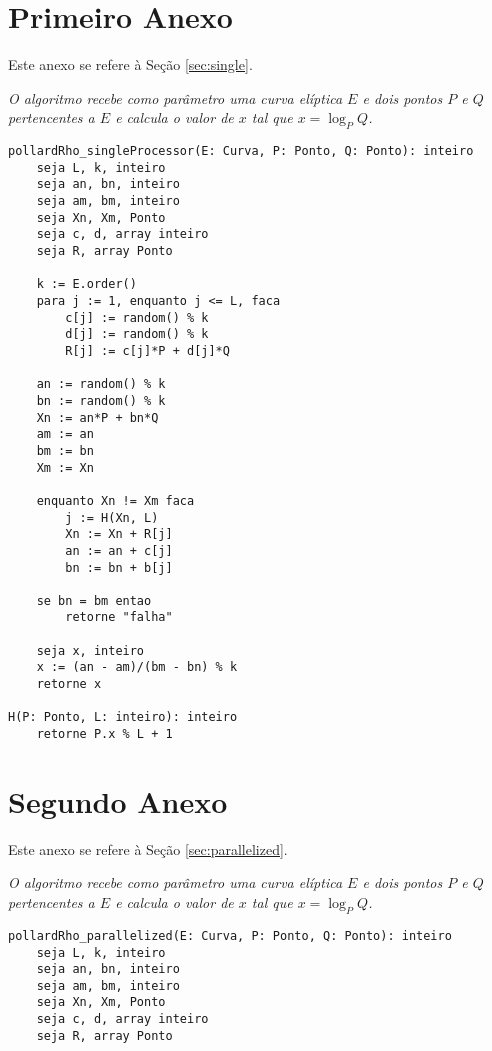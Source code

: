 \begin{anexosenv}

\partanexos

\chapter{Primeiro Anexo} \label{alg:single}
Este anexo se refere à Seção \ref{sec:single}.

\textit{O algoritmo recebe como parâmetro uma curva elíptica \(E\) e dois pontos \(P\) e \(Q\) pertencentes a \(E\) e calcula o valor de \(x\) tal que $x = \log_P Q$.}

%
%
\begin{lstlisting}[caption={Algoritmo Pollard-rho com único processador.},label=single_processor]
pollardRho_singleProcessor(E: Curva, P: Ponto, Q: Ponto): inteiro
	seja L, k, inteiro
	seja an, bn, inteiro
	seja am, bm, inteiro
	seja Xn, Xm, Ponto
	seja c, d, array inteiro
	seja R, array Ponto

	k := E.order()
	para j := 1, enquanto j <= L, faca
		c[j] := random() % k
		d[j] := random() % k
		R[j] := c[j]*P + d[j]*Q

	an := random() % k
	bn := random() % k
	Xn := an*P + bn*Q
	am := an
	bm := bn
	Xm := Xn

	enquanto Xn != Xm faca
		j := H(Xn, L)
		Xn := Xn + R[j]
		an := an + c[j]
		bn := bn + b[j]

	se bn = bm entao
		retorne "falha"

	seja x, inteiro
	x := (an - am)/(bm - bn) % k
	retorne x

H(P: Ponto, L: inteiro): inteiro
	retorne P.x % L + 1

\end{lstlisting}

\chapter{Segundo Anexo} \label{alg:parallelized}
Este anexo se refere à Seção \ref{sec:parallelized}.

\textit{O algoritmo recebe como parâmetro uma curva elíptica \(E\) e dois pontos \(P\) e \(Q\) pertencentes a \(E\) e calcula o valor de \(x\) tal que $x = \log_P Q$.}

%
%
\begin{lstlisting}[caption={Algoritmo Pollard-rho paralelizado.},label=parallelized]
pollardRho_parallelized(E: Curva, P: Ponto, Q: Ponto): inteiro
	seja L, k, inteiro
	seja an, bn, inteiro
	seja am, bm, inteiro
	seja Xn, Xm, Ponto
	seja c, d, array inteiro
	seja R, array Ponto


\end{lstlisting}
\end{anexosenv}
